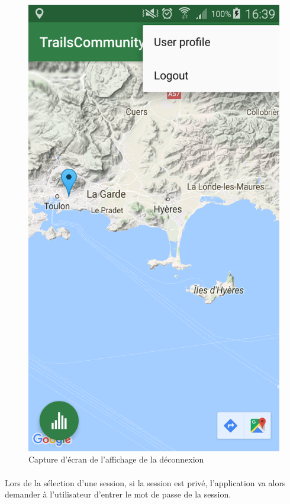 \documentclass[titlepage, 12pt]{report}
\begin{document}
\begin{figure}[!h]
	\caption{Capture d'écran de l'affichage de la déconnexion}
	\label{screenshots_logout}
	\centering
	\includegraphics[scale=0.2]{Images/screenshots/logout.png}
\end{figure}

\clearpage

\paragraph{}Lors de la sélection d'une session, si la session est privé, l'application va alors demander à l'utilisateur d'entrer le mot de passe de la session.
\end{document}
